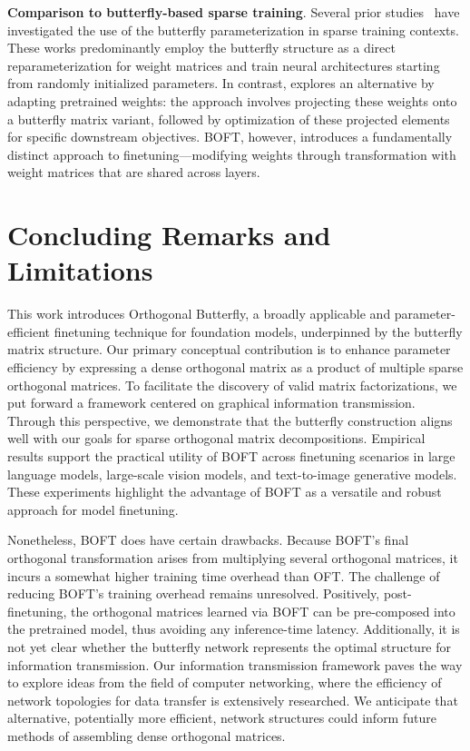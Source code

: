 \textbf{Comparison to butterfly-based sparse training}. Several prior studies~\cite{dao2019learning,dao2019kaleidoscope,chen2022pixelated,dao2022monarch} have investigated the use of the butterfly parameterization in sparse training contexts. These works predominantly employ the butterfly structure as a direct reparameterization for weight matrices and train neural architectures starting from randomly initialized parameters. In contrast, \cite{dao2022monarch} explores an alternative by adapting pretrained weights: the approach involves projecting these weights onto a butterfly matrix variant, followed by optimization of these projected elements for specific downstream objectives. BOFT, however, introduces a fundamentally distinct approach to finetuning—modifying weights through transformation with weight matrices that are shared across layers.



\section{Concluding Remarks and Limitations}

This work introduces Orthogonal Butterfly, a broadly applicable and parameter-efficient finetuning technique for foundation models, underpinned by the butterfly matrix structure. Our primary conceptual contribution is to enhance parameter efficiency by expressing a dense orthogonal matrix as a product of multiple sparse orthogonal matrices. To facilitate the discovery of valid matrix factorizations, we put forward a framework centered on graphical information transmission. Through this perspective, we demonstrate that the butterfly construction aligns well with our goals for sparse orthogonal matrix decompositions. Empirical results support the practical utility of BOFT across finetuning scenarios in large language models, large-scale vision models, and text-to-image generative models. These experiments highlight the advantage of BOFT as a versatile and robust approach for model finetuning.

Nonetheless, BOFT does have certain drawbacks. Because BOFT's final orthogonal transformation arises from multiplying several orthogonal matrices, it incurs a somewhat higher training time overhead than OFT. The challenge of reducing BOFT's training overhead remains unresolved. Positively, post-finetuning, the orthogonal matrices learned via BOFT can be pre-composed into the pretrained model, thus avoiding any inference-time latency. Additionally, it is not yet clear whether the butterfly network represents the optimal structure for information transmission. Our information transmission framework paves the way to explore ideas from the field of computer networking, where the efficiency of network topologies for data transfer is extensively researched. We anticipate that alternative, potentially more efficient, network structures could inform future methods of assembling dense orthogonal matrices.